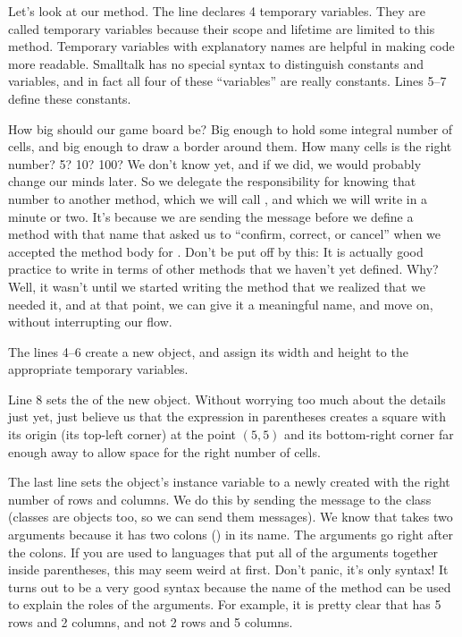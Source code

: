 \documentclass[a4paper,10pt,twoside]{book}
\begin{document}
Let's look at our  method.
The line   declares 4 temporary variables.
They are called temporary variables because their scope and lifetime are limited to this method.
Temporary variables with explanatory names are helpful in making code more readable.
Smalltalk has no special syntax to distinguish constants and variables, and in fact all four of these ``variables'' are really constants.
Lines 5--7 define these constants.

How big should our game board be?
Big enough to hold some integral number of cells, and big enough to draw a border around them.
How many cells is the right number?
5? 10? 100?
We don't know yet, and if we did, we would probably change our minds later.
So we delegate the responsibility for knowing that number to another method, which we will call , and which we will write in a minute or two.
It's because we are sending the  message before we define a method with that name that \squeak asked us to ``confirm, correct, or cancel'' when we accepted the method body for .
Don't be put off by this:
It is actually good practice to write in terms of other methods that we haven't yet defined.
Why?
Well, it wasn't until we started writing the  method that we realized that we needed it, and at that point, we can give it a meaningful name, and move on, without interrupting our flow.

The lines 4--6 create a new  object, and assign its width and height to the appropriate temporary variables.

Line 8 sets the  of the new object.
Without worrying too much about the details just yet, just believe us that the expression in parentheses creates a square with its origin (\ie its top-left corner) at the point $(5,5)$ and its bottom-right corner far enough away to allow space for the right number of cells.

The last line sets the  object's instance variable  to a newly created  with the right number of rows and columns.
We do this by sending the message  to the  class (classes are objects too, so we can send them messages).
We know that  takes two arguments because it has two colons (\ct{:}) in its name.
The arguments go right after the colons.
If you are used to languages that put all of the arguments together inside parentheses, this may seem weird at first.
Don't panic, it's only syntax!
It turns out to be a very good syntax because the name of the method can be used to explain the roles of the arguments.
For example, it is pretty clear that  has 5 rows and 2 columns, and not 2 rows and 5 columns.
\end{document}
